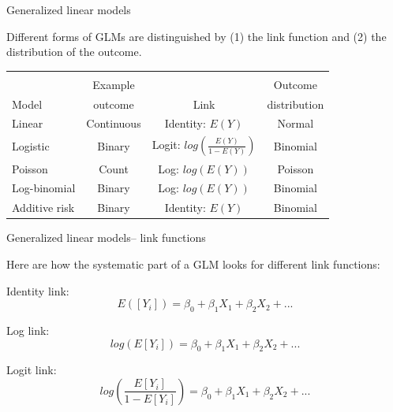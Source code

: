 \documentclass[ignorenonframetext,]{beamer}
\begin{document}
\begin{frame}{Generalized linear models}

Different forms of GLMs are distinguished by (1) the link function and
(2) the distribution of the outcome.

\centering \small

\begin{tabular}{lccc}
\toprule \\
 & Example & & Outcome \\
Model & outcome & Link &  distribution \\
\midrule
Linear & Continuous & Identity: $E(Y)$ & Normal\\
Logistic & Binary & Logit: $log(\frac{E(Y)}{1-E(Y)})$ & Binomial\\
Poisson & Count & Log: $log(E(Y))$ & Poisson \\
Log-binomial & Binary & Log: $log(E(Y))$ & Binomial\\
Additive risk & Binary & Identity: $E(Y)$  & Binomial\\
\bottomrule
\end{tabular}

\end{frame}

\begin{frame}{Generalized linear models-- link functions}

Here are how the systematic part of a GLM looks for different link
functions:

\begin{block}{Identity link:}
$$
E([Y_i]) = \beta_0 + \beta_1X_1 + \beta_2X_2 + ...
$$
\end{block}

\begin{block}{Log link:} 
$$
log(E[Y_i]) = \beta_0 + \beta_1X_1 + \beta_2X_2 + ...
$$
\end{block}

\begin{block}{Logit link:}
$$
log\left(\frac{E[Y_i]}{1 - E[Y_i]}\right) = \beta_0 + \beta_1X_1 + \beta_2X_2 + ...
$$
\end{block}

\end{frame}
\end{document}
